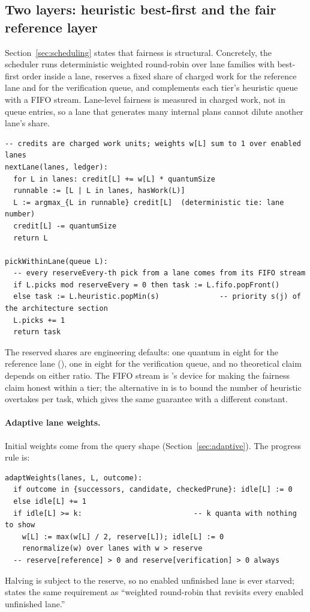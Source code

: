 \subsection{Two layers: heuristic best-first and the fair reference layer}\label{alg:layers}

Section~\ref{sec:scheduling} states that fairness is structural. Concretely, the scheduler runs deterministic weighted round-robin over lane families with best-first order inside a lane, reserves a fixed share of charged work for the reference lane and for the verification queue, and complements each tier's heuristic queue with a FIFO stream. Lane-level fairness is measured in charged work, not in queue entries, so a lane that generates many internal plans cannot dilute another lane's share.
\begin{lstlisting}
-- credits are charged work units; weights w[L] sum to 1 over enabled lanes
nextLane(lanes, ledger):
  for L in lanes: credit[L] += w[L] * quantumSize
  runnable := [L | L in lanes, hasWork(L)]
  L := argmax_{L in runnable} credit[L]  (deterministic tie: lane number)
  credit[L] -= quantumSize
  return L

pickWithinLane(queue L):
  -- every reserveEvery-th pick from a lane comes from its FIFO stream
  if L.picks mod reserveEvery = 0 then task := L.fifo.popFront()
  else task := L.heuristic.popMin(s)              -- priority s(j) of the architecture section
  L.picks += 1
  return task
\end{lstlisting}
The reserved shares are engineering defaults: one quantum in eight for the reference lane (), one in eight for the verification queue, and no theoretical claim depends on either ratio. The FIFO stream is 's device for making the fairness claim honest within a tier; the alternative in  is to bound the number of heuristic overtakes per task, which gives the same guarantee with a different constant.

\paragraph{Adaptive lane weights.} Initial weights come from the query shape (Section~\ref{sec:adaptive}). The progress rule is:
\begin{lstlisting}
adaptWeights(lanes, L, outcome):
  if outcome in {successors, candidate, checkedPrune}: idle[L] := 0
  else idle[L] += 1
  if idle[L] >= k:                          -- k quanta with nothing to show
    w[L] := max(w[L] / 2, reserve[L]); idle[L] := 0
    renormalize(w) over lanes with w > reserve
  -- reserve[reference] > 0 and reserve[verification] > 0 always
\end{lstlisting}
Halving is subject to the reserve, so no enabled unfinished lane is ever starved;  states the same requirement as ``weighted round-robin that revisits every enabled unfinished lane.''

